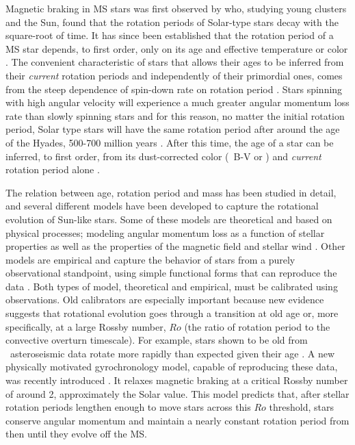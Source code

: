 Magnetic braking in MS stars was first observed by \citet{skumanich1972} who,
studying young clusters and the Sun, found that the rotation periods of
Solar-type stars decay with the square-root of time.
It has since been established that the rotation period of a MS star depends,
to first order, only on its age and effective temperature or color
\citep[\eg][]{barnes2003}.
The convenient characteristic of stars that allows their ages to be inferred
from their {\it current} rotation periods and independently of their
primordial ones, comes from the steep dependence of spin-down rate on rotation
period \citep{kawaler1989}.
Stars spinning with high angular velocity will experience a much greater
angular momentum loss rate than slowly spinning stars and for this reason, no
matter the initial rotation period, Solar type stars will have the same
rotation period after around the age of the Hyades, 500-700 million years
\citep{irwin2009, gallet2015}.
After this time, the age of a star can be inferred, to first order, from its
dust-corrected color (\eg\ B-V or \gcolor) and {\it current} rotation period
alone \citep[See][for an analysis of how initial conditions effect gyrochronal
ages]{epstein2014}.

The relation between age, rotation period and mass has been studied in detail,
and several different models have been developed to capture the rotational
evolution of Sun-like stars.
Some of these models are theoretical and based on physical processes; modeling
angular momentum loss as a function of stellar properties as well as the
properties of the magnetic field and stellar wind \citep[\eg][]{kawaler1988,
kawaler1989, pinsonneault1989, vansaders2013, matt2015, vansaders2016}.
Other models are empirical and capture the behavior of stars from a purely
observational standpoint, using simple functional forms that can reproduce the
data \citep[\eg][]{barnes2003, barnes2007, mamajek2008, angus2015}.
Both types of model, theoretical and empirical, must be calibrated using
observations.
Old calibrators are especially important because new evidence suggests that
rotational evolution goes through a transition at old age or, more
specifically, at a large Rossby number, $Ro$ (the ratio of rotation period to
the convective overturn timescale).
For example, stars shown to be old from \kepler\ asteroseismic data rotate
more rapidly than expected given their age \citep{angus2015, vansaders2016}.
A new physically motivated gyrochronology model, capable of reproducing these
data, was recently introduced \citep{vansaders2016}.
It relaxes magnetic braking at a critical Rossby number of around 2,
approximately the Solar value.
This model predicts that, after stellar rotation periods lengthen enough to
move stars across this $Ro$ threshold, stars conserve angular momentum and
maintain a nearly constant rotation period from then until they evolve off the
MS.

